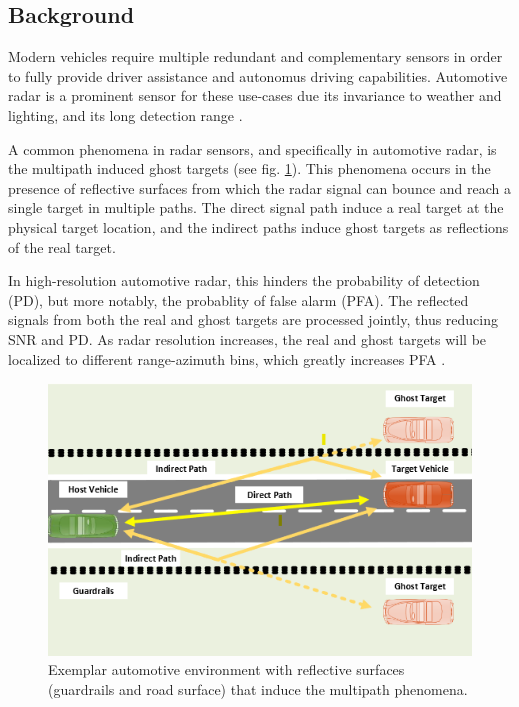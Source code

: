 \documentclass[../main.tex]{subfiles}
\begin{document}
\subsection{Background}
Modern vehicles require multiple redundant and complementary sensors in order to fully provide driver assistance and autonomus driving capabilities. Automotive radar is a prominent sensor for these use-cases due its invariance to weather and lighting, and its long detection range \cite{bilik_radar_2019}.

\par
A common phenomena in radar sensors, and specifically in automotive radar, is the multipath induced ghost targets (see fig. \ref{fig:multipath}). This phenomena occurs in the presence of reflective surfaces from which the radar signal can bounce and reach a single target in multiple paths. The direct signal path induce a real target at the physical target location, and the indirect paths induce ghost targets as reflections of the real target. 

\par
In high-resolution automotive radar, this hinders the probability of detection (PD), but more notably, the probablity of false alarm (PFA). The reflected signals from both the real and ghost targets are processed jointly, thus reducing SNR and PD. As radar resolution increases, the real and ghost targets will be localized to different range-azimuth bins, which greatly increases PFA \cite{bilik_radar_2019}.


\begin{figure}[ht!]
  \includegraphics[scale=0.6]{figures/multipath.png}
  \caption{Exemplar automotive environment with reflective surfaces (guardrails and road surface) that induce the multipath phenomena.}
  \label{fig:multipath}
\end{figure}
\end{document}

